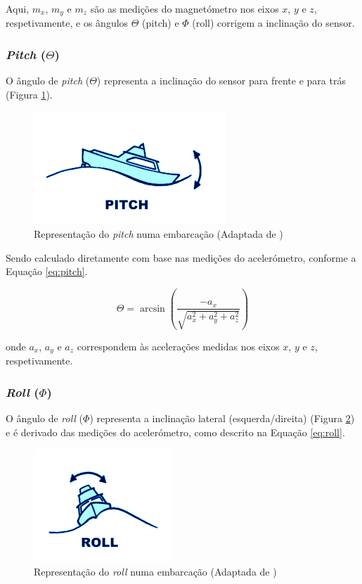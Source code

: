 Aqui, \(m_x\), \(m_y\) e \(m_z\) são as medições do magnetómetro nos eixos \(x\), \(y\) e \(z\), respetivamente, e os ângulos \(\Theta\) (pitch) e \(\Phi\) (roll) corrigem a inclinação do sensor.

\subsubsection{\emph{Pitch} (\(\Theta\))}
O ângulo de  \emph{pitch} (\(\Theta\)) representa a inclinação do sensor para frente e para trás (Figura \ref{fig:pitch}).

\begin{figure}[H]
    \centering
    \includegraphics[height=0.2\linewidth]{figuras/Pitch.png}
    \caption[Representação do \emph{pitch} numa embarcação]{Representação do \emph{pitch} numa embarcação (Adaptada de \cite{imagem-yaw-pitch-roll})}
    \label{fig:pitch}
\end{figure}

Sendo calculado diretamente com base nas medições do acelerómetro, conforme a Equação \ref{eq:pitch}.

\begin{equation}
    \Theta = \arcsin{\left(\frac{-a_x}{\sqrt{a_x^2 + a_y^2 + a_z^2}}\right)}
    \label{eq:pitch}
\end{equation}

onde \(a_x\), \(a_y\) e \(a_z\) correspondem às acelerações medidas nos eixos \(x\), \(y\) e \(z\), respetivamente.

\subsubsection{\emph{Roll} (\(\Phi\))}
O ângulo de \emph{roll} (\(\Phi\)) representa a inclinação lateral (esquerda/direita) (Figura \ref{fig:roll}) e é derivado das medições do acelerómetro, como descrito na Equação \ref{eq:roll}.

\begin{figure}[H]
    \centering
    \includegraphics[height=0.2\linewidth]{figuras/Roll.png}
    \caption[Representação do \emph{roll} numa embarcação]{Representação do \emph{roll} numa embarcação (Adaptada de \cite{imagem-yaw-pitch-roll})}
    \label{fig:roll}
\end{figure}

